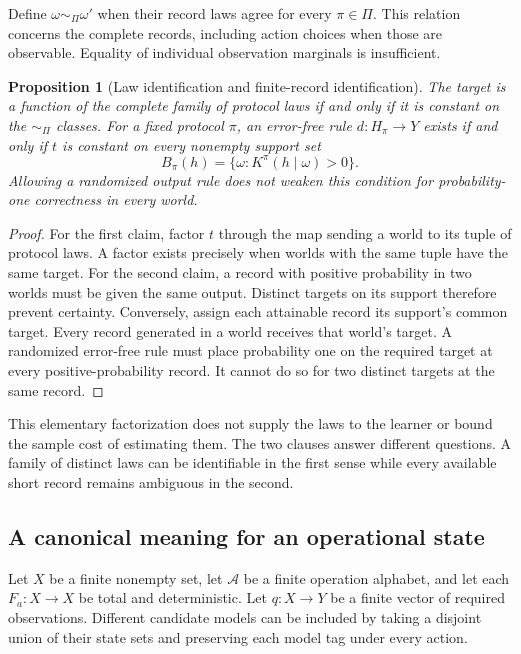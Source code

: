 \documentclass[11pt,letterpaper]{article}
\theoremstyle{plain}
\newtheorem{proposition}[theorem]{Proposition}
\theoremstyle{definition}
\newcommand{\A}{\mathcal A}\newcommand{\C}{\mathcal C}\newcommand{\E}{\mathcal E}
\begin{document}
Define $\omega\sim_\Pi\omega'$ when their record laws agree for every $\pi\in\Pi$. This relation concerns the complete records, including action choices when those are observable. Equality of individual observation marginals is insufficient.

\begin{proposition}[Law identification and finite-record identification]\label{prop:law}
The target is a function of the complete family of protocol laws if and only if it is constant on the $\sim_\Pi$ classes. For a fixed protocol $\pi$, an error-free rule $d:H_\pi\to Y$ exists if and only if $t$ is constant on every nonempty support set
\[
B_\pi(h)=\{\omega:K^\pi(h\mid\omega)>0\}.
\]
Allowing a randomized output rule does not weaken this condition for probability-one correctness in every world.
\end{proposition}
\begin{proof}
For the first claim, factor $t$ through the map sending a world to its tuple of protocol laws. A factor exists precisely when worlds with the same tuple have the same target. For the second claim, a record with positive probability in two worlds must be given the same output. Distinct targets on its support therefore prevent certainty. Conversely, assign each attainable record its support's common target. Every record generated in a world receives that world's target. A randomized error-free rule must place probability one on the required target at every positive-probability record. It cannot do so for two distinct targets at the same record.
\end{proof}

This elementary factorization does not supply the laws to the learner or bound the sample cost of estimating them. The two clauses answer different questions. A family of distinct laws can be identifiable in the first sense while every available short record remains ambiguous in the second.

\subsection{A canonical meaning for an operational state}
Let $X$ be a finite nonempty set, let $\A$ be a finite operation alphabet, and let each $F_a:X\to X$ be total and deterministic. Let $q:X\to Y$ be a finite vector of required observations. Different candidate models can be included by taking a disjoint union of their state sets and preserving each model tag under every action.
\end{document}
